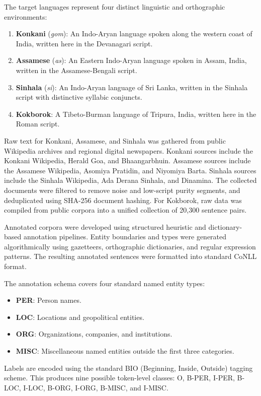 \documentclass[pdflatex,sn-mathphys-num]{sn-jnl}
\begin{document}
The target languages represent four distinct linguistic and orthographic environments:
\begin{enumerate}
    \item \textbf{Konkani} (\textit{gom}): An Indo-Aryan language spoken along the western coast of India, written here in the Devanagari script.
    \item \textbf{Assamese} (\textit{as}): An Eastern Indo-Aryan language spoken in Assam, India, written in the Assamese-Bengali script.
    \item \textbf{Sinhala} (\textit{si}): An Indo-Aryan language of Sri Lanka, written in the Sinhala script with distinctive syllabic conjuncts.
    \item \textbf{Kokborok}: A Tibeto-Burman language of Tripura, India, written here in the Roman script.
\end{enumerate}

Raw text for Konkani, Assamese, and Sinhala was gathered from public Wikipedia archives and regional digital newspapers. Konkani sources include the Konkani Wikipedia, Herald Goa, and Bhaangarbhuin. Assamese sources include the Assamese Wikipedia, Asomiya Pratidin, and Niyomiya Barta. Sinhala sources include the Sinhala Wikipedia, Ada Derana Sinhala, and Dinamina. The collected documents were filtered to remove noise and low-script purity segments, and deduplicated using SHA-256 document hashing. For Kokborok, raw data was compiled from public corpora into a unified collection of 20,300 sentence pairs.

Annotated corpora were developed using structured heuristic and dictionary-based annotation pipelines. Entity boundaries and types were generated algorithmically using gazetteers, orthographic dictionaries, and regular expression patterns. The resulting annotated sentences were formatted into standard CoNLL format.

The annotation schema covers four standard named entity types:
\begin{itemize}
    \item \textbf{PER}: Person names.
    \item \textbf{LOC}: Locations and geopolitical entities.
    \item \textbf{ORG}: Organizations, companies, and institutions.
    \item \textbf{MISC}: Miscellaneous named entities outside the first three categories.
\end{itemize}

Labels are encoded using the standard BIO (Beginning, Inside, Outside) tagging scheme. This produces nine possible token-level classes: O, B-PER, I-PER, B-LOC, I-LOC, B-ORG, I-ORG, B-MISC, and I-MISC.
\end{document}
